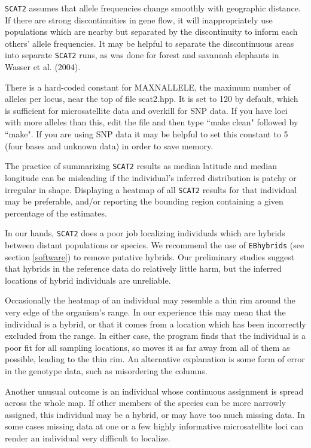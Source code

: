 \documentclass[10pt,titlepage,times,letterpaper]{article}
\def\SCAT{{\tt SCAT2} }
\begin{document}
\SCAT assumes that allele frequencies change smoothly with geographic
distance.  If there are strong discontinuities in gene flow, it will
inappropriately use populations which are nearby but separated by the
discontinuity to inform each others' allele frequencies.  It may be
helpful to separate the discontinuous areas into separate \SCAT runs,
as was done for forest and savannah elephants in Wasser et al. (2004).

There is a hard-coded constant for MAXNALLELE, the maximum number
of alleles per locus, near the top of file scat2.hpp.  It is set to 120
by default, which is sufficient for microsatellite data and overkill for
SNP data.  If you have loci with more alleles than this, edit the
file and then type ``make clean" followed by ``make".  If you are using
SNP data it may be helpful to set this constant to 5 (four bases and unknown
data) in order to save memory.

The practice of summarizing \SCAT results as median latitude and
median longitude can be misleading if the individual's
inferred distribution is patchy or irregular in shape.  Displaying
a heatmap of all \SCAT results for that individual may be preferable,
and/or reporting the bounding region containing a given percentage
of the estimates.

In our hands, \SCAT does a poor job localizing individuals which are
hybrids between distant populations or species.  We recommend the use
of {\tt EBhybrids} (see section \ref{software}) to remove putative hybrids.
Our preliminary studies suggest that hybrids in the reference data do
relatively little harm, but the inferred locations of hybrid individuals are
unreliable. 

Occasionally the heatmap of an individual may resemble a thin rim around the
very edge of the organism's range.  In our experience this may mean that
the individual is a hybrid, or that it comes from a location which has been
incorrectly excluded from the range.  In either case, the program finds that
the individual is a poor fit for all sampling locations, so moves it as far
away from all of them as possible, leading to the thin rim.  An alternative
explanation is some form of error in the genotype data, such as misordering
the columns.

Another unusual outcome is an individual whose continuous assignment is
spread across the whole map.  If other members of the species can be more
narrowly assigned, this individual may be a hybrid, or may have too much
missing data.  In some cases missing data at one or a few highly informative
microsatellite loci can render an individual very difficult to localize.
\end{document}
